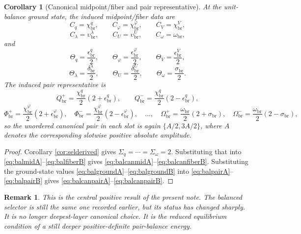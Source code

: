 \documentclass[11pt]{article}
\newcommand{\AbsReadAmp}{\chi_{\mathrm{br}}^{q}}
\newcommand{\AbsCovAmp}{\chi_{\mathrm{br}}^{\varphi}}
\newcommand{\AbsRelaxAmp}{\chi_{\mathrm{br}}^{V}}
\newcommand{\AbsWellAmp}{\upsilon_{\mathrm{br}}^{\lambda}}
\newcommand{\AbsEqAmp}{\upsilon_{\mathrm{br}}^{U}}
\newcommand{\AbsScaleAmp}{\omega_{\mathrm{br}}}
\newcommand{\PolRead}{\epsilon_{\mathrm{br}}^{q}}
\newcommand{\PolCov}{\epsilon_{\mathrm{br}}^{\varphi}}
\newcommand{\PolRelax}{\epsilon_{\mathrm{br}}^{V}}
\newcommand{\PolWell}{\delta_{\mathrm{br}}^{\lambda}}
\newcommand{\PolEq}{\delta_{\mathrm{br}}^{U}}
\newcommand{\PolScale}{\sigma_{\mathrm{br}}}
\newcommand{\PairReadPlus}{Q_{\mathrm{br}}^{+}}
\newcommand{\PairReadMinus}{Q_{\mathrm{br}}^{-}}
\newcommand{\PairCovPlus}{\Phi_{\mathrm{br}}^{+}}
\newcommand{\PairCovMinus}{\Phi_{\mathrm{br}}^{-}}
\newcommand{\PairScalePlus}{\Omega_{\mathrm{br}}^{+}}
\newcommand{\PairScaleMinus}{\Omega_{\mathrm{br}}^{-}}
\newcommand{\MidRead}{C_{q}}
\newcommand{\MidCov}{C_{\varphi}}
\newcommand{\MidRelax}{C_{V}}
\newcommand{\MidWell}{C_{\lambda}}
\newcommand{\MidEq}{C_{U}}
\newcommand{\MidScale}{C_{\omega}}
\newcommand{\FiberRead}{\Theta_{q}}
\newcommand{\FiberCov}{\Theta_{\varphi}}
\newcommand{\FiberRelax}{\Theta_{V}}
\newcommand{\FiberWell}{\Theta_{\lambda}}
\newcommand{\FiberEq}{\Theta_{U}}
\newcommand{\FiberScale}{\Theta_{\omega}}
\newcommand{\SelRead}{\Sigma_{q}}
\newcommand{\SelScale}{\Sigma_{\omega}}
\newtheorem{remark}{Remark}
\newtheorem{corollary}{Corollary}
\begin{document}
\begin{corollary}[Canonical midpoint/fiber and pair representative]
\label{cor:balcanonical}
At the unit-balance ground state, the induced midpoint/fiber data are
\begin{equation}
\MidRead=\AbsReadAmp,
\qquad
\MidCov=\AbsCovAmp,
\qquad
\MidRelax=\AbsRelaxAmp,
\label{eq:balcanmidA}
\end{equation}
\begin{equation}
\MidWell=\AbsWellAmp,
\qquad
\MidEq=\AbsEqAmp,
\qquad
\MidScale=\AbsScaleAmp,
\label{eq:balcanmidB}
\end{equation}
and
\begin{equation}
\FiberRead=\frac{\PolRead}{2},
\qquad
\FiberCov=\frac{\PolCov}{2},
\qquad
\FiberRelax=\frac{\PolRelax}{2},
\label{eq:balcanfiberA}
\end{equation}
\begin{equation}
\FiberWell=\frac{\PolWell}{2},
\qquad
\FiberEq=\frac{\PolEq}{2},
\qquad
\FiberScale=\frac{\PolScale}{2}.
\label{eq:balcanfiberB}
\end{equation}
The induced pair representative is
\begin{equation}
\PairReadPlus=\frac{\AbsReadAmp}{2}(2+\PolRead),
\qquad
\PairReadMinus=\frac{\AbsReadAmp}{2}(2-\PolRead),
\label{eq:balcanpairA}
\end{equation}
\begin{equation}
\PairCovPlus=\frac{\AbsCovAmp}{2}(2+\PolCov),
\quad
\PairCovMinus=\frac{\AbsCovAmp}{2}(2-\PolCov),
\quad
\ldots,
\quad
\PairScalePlus=\frac{\AbsScaleAmp}{2}(2+\PolScale),
\quad
\PairScaleMinus=\frac{\AbsScaleAmp}{2}(2-\PolScale),
\label{eq:balcanpairB}
\end{equation}
so the unordered canonical pair in each slot is again \(\{A/2,3A/2\}\), where \(A\) denotes the corresponding slotwise positive absolute amplitude.
\end{corollary}

\begin{proof}
Corollary \ref{cor:selderived} gives \(\SelRead=\cdots=\SelScale=2\). Substituting that into \eqref{eq:balmidA}--\eqref{eq:balfiberB} gives \eqref{eq:balcanmidA}--\eqref{eq:balcanfiberB}. Substituting the ground-state values \eqref{eq:balgroundA}--\eqref{eq:balgroundB} into \eqref{eq:balpairA}--\eqref{eq:balpairB} gives \eqref{eq:balcanpairA}--\eqref{eq:balcanpairB}.
\end{proof}

\begin{remark}
This is the central positive result of the present note. The balanced selector is still the same one recorded earlier, but its status has changed sharply. It is no longer deepest-layer canonical choice. It is the reduced equilibrium condition of a still deeper positive-definite pair-balance energy.
\end{remark}
\end{document}
